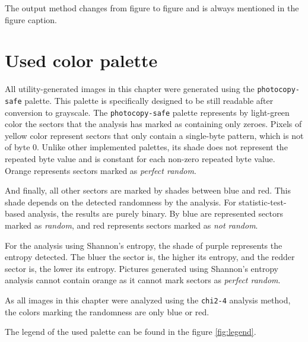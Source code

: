 \documentclass[
  digital, %
  color,   %
  oneside, %
  lof,     %
  nolot,     %
]{fithesis4}
\begin{document}
The output method changes from figure to figure and is always mentioned in the figure caption.

\section{Used color palette}
\label{sec:used-color-palette}

All utility-generated images in this chapter were generated using the \texttt{photocopy-safe} palette.
This palette is specifically designed to be still readable after conversion to grayscale.
The \texttt{photocopy-safe} palette represents by light-green color the sectors that the analysis has marked as containing only zeroes.
Pixels of yellow color represent sectors that only contain a single-byte pattern, which is not of byte 0.
Unlike other implemented palettes, its shade does not represent the repeated byte value and is constant for each non-zero repeated byte value.
Orange represents sectors marked as \emph{perfect random}.

And finally, all other sectors are marked by shades between blue and red.
This shade depends on the detected randomness by the analysis.
For statistic-test-based analysis, the results are purely binary.
By blue are represented sectors marked as \emph{random}, and red represents sectors marked as \emph{not random}.

For the analysis using Shannon's entropy, the shade of purple represents the entropy detected.
The bluer the sector is, the higher its entropy, and the redder sector is, the lower its entropy.
Pictures generated using Shannon's entropy analysis cannot contain orange as it cannot mark sectors as \emph{perfect random}.

As all images in this chapter were analyzed using the \texttt{chi2-4} analysis method, the colors marking the randomness are only blue or red.

The legend of the used palette can be found in the figure \ref{fig:legend}.

\end{document}
